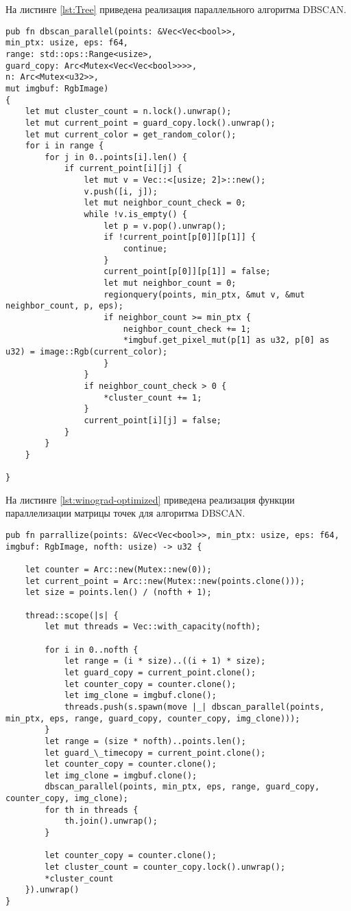 На листинге \ref{lst:Tree} приведена реализация параллельного алгоритма DBSCAN.

\newpage

\begin{lstlisting}[label=lst:Tree,caption=Реализация параллельного алгоритма DBSCAN]
pub fn dbscan_parallel(points: &Vec<Vec<bool>>, 
min_ptx: usize, eps: f64, 
range: std::ops::Range<usize>, 
guard_copy: Arc<Mutex<Vec<Vec<bool>>>>, 
n: Arc<Mutex<u32>>,
mut imgbuf: RgbImage) 
{
	let mut cluster_count = n.lock().unwrap();
	let mut current_point = guard_copy.lock().unwrap();
	let mut current_color = get_random_color();
	for i in range {
		for j in 0..points[i].len() {
			if current_point[i][j] {
				let mut v = Vec::<[usize; 2]>::new();
				v.push([i, j]);
				let mut neighbor_count_check = 0;
				while !v.is_empty() {
					let p = v.pop().unwrap();
					if !current_point[p[0]][p[1]] {
						continue;
					}
					current_point[p[0]][p[1]] = false;
					let mut neighbor_count = 0;
					regionquery(points, min_ptx, &mut v, &mut neighbor_count, p, eps);
					if neighbor_count >= min_ptx {
						neighbor_count_check += 1;
						*imgbuf.get_pixel_mut(p[1] as u32, p[0] as u32) = image::Rgb(current_color);
					}
				}
				if neighbor_count_check > 0 {
					*cluster_count += 1;
				}
				current_point[i][j] = false;
			}
		}
	}
	
}
\end{lstlisting}	

\newpage
На листинге \ref{lst:winograd-optimized} приведена реализация функции параллелизации матрицы точек для алгоритма DBSCAN.
\begin{lstlisting}[label=lst:winograd-optimized,caption=Реализация функции параллелизации матрицы точек]
pub fn parrallize(points: &Vec<Vec<bool>>, min_ptx: usize, eps: f64, imgbuf: RgbImage, nofth: usize) -> u32 {
	
	let counter = Arc::new(Mutex::new(0));
	let current_point = Arc::new(Mutex::new(points.clone()));
	let size = points.len() / (nofth + 1);
	
	thread::scope(|s| {
		let mut threads = Vec::with_capacity(nofth);
		
		for i in 0..nofth {
			let range = (i * size)..((i + 1) * size);
			let guard_copy = current_point.clone();
			let counter_copy = counter.clone();
			let img_clone = imgbuf.clone();
			threads.push(s.spawn(move |_| dbscan_parallel(points, min_ptx, eps, range, guard_copy, counter_copy, img_clone)));
		}
		let range = (size * nofth)..points.len();
		let guard_\_timecopy = current_point.clone();
		let counter_copy = counter.clone();
		let img_clone = imgbuf.clone();
		dbscan_parallel(points, min_ptx, eps, range, guard_copy, counter_copy, img_clone);
		for th in threads {
			th.join().unwrap();
		}
		
		let counter_copy = counter.clone();
		let cluster_count = counter_copy.lock().unwrap();
		*cluster_count
	}).unwrap()
}
\end{lstlisting}	


